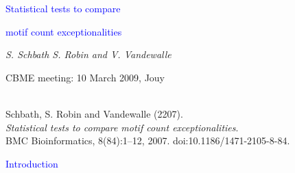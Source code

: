 \documentclass[dvips, lscape]{foils}
\newcommand{\textblue}[1]{\textcolor{blue}{#1}}
\newcommand{\chapter}[1]{\centerline{\LARGE \textblue{#1}}}
\newcommand{\section}[1]{\centerline{\Large \textblue{#1}}}
\newcommand{\subsection}[1]{\noindent{\large \textblue{#1}}}
\newcommand{\paragraph}[1]{\noindent {\textblue{#1}}}
\begin{document}
\landscape
\headrulewidth 0pt 
\pagestyle{empty} 
\cfoot{}
\rfoot{}
\setcounter{page}{0}

\begin{center}
  \chapter{Statistical tests to compare}
  \medskip
  \chapter{motif count exceptionalities} 

  \bigskip

  {\sl \large S. Schbath S. Robin and V. Vandewalle}

  \bigskip

  {CBME meeting: 10 March 2009, Jouy}
\end{center}

\vspace{3cm}
\paragraph{Reference:}\\
Schbath, S. Robin and Vandewalle (2207). \\ 
{\sl Statistical tests to compare motif count exceptionalities}. \\
BMC Bioinformatics, 8(84):1--12, 2007. doi:10.1186/1471-2105-8-84.

\newpage
\section{Introduction}

\subsection{Motif counts in DNA sequences}
\end{document}
